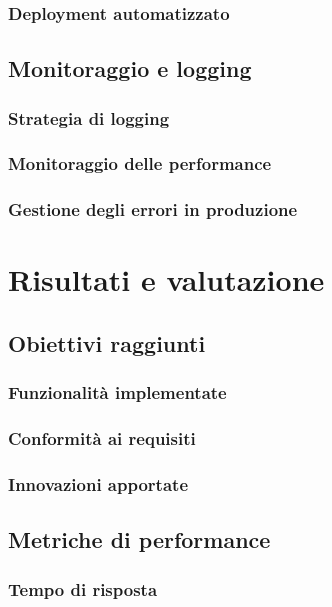 \documentclass[12pt,a4paper,oneside]{report}
\begin{document}
\subsection{Deployment automatizzato}

\section{Monitoraggio e logging}
\subsection{Strategia di logging}

\subsection{Monitoraggio delle performance}

\subsection{Gestione degli errori in produzione}




\chapter{Risultati e valutazione}
\section{Obiettivi raggiunti}
\subsection{Funzionalità implementate}

\subsection{Conformità ai requisiti}

\subsection{Innovazioni apportate}

\section{Metriche di performance}
\subsection{Tempo di risposta}
\end{document}
